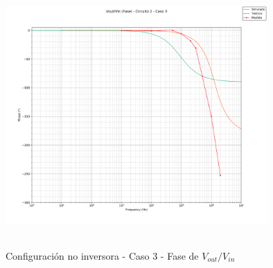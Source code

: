 \begin{figure}[H] %
	\centering
	\includegraphics[width=10cm,height=10cm,keepaspectratio]{../EJ1/00GRAFICOS/c2c3/c2c3voviFASE.png}
	\caption{Configuración no inversora - Caso 3 - Fase de $V_{out}/V_{in}$}
	\label{c2c3voviP}
\end{figure}



